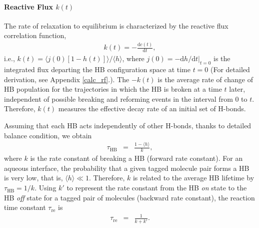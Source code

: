 \paragraph{Reactive Flux $k(t)$} 
The rate of relaxation to equilibrium is characterized by the reactive flux correlation function, 
\begin{eqnarray}
k(t) = -\frac{\text{d}c(t)}{\text{d}t},
\label{eq:k}
\end{eqnarray}
i.e., $k(t)=\langle j(0)[1-h(t)]\rangle/\langle h\rangle$\cite{AL96,AL00},
where 
$j(0)=-\text{d}h/\text{d}t|_{t=0}$ 
is the integrated flux departing the HB configuration space at time $t=0$ (For detailed derivation, see Appendix \ref{calc_rf}.).
The $-k(t)$ is the average rate of change of HB population for the trajectories in which the HB is broken at a time $t$ later\cite{AL96}, 
independent of possible breaking and reforming events in the interval from 0 to $t$.
Therefore, $k(t)$ measures the effective decay rate of an initial set of H-bonds\cite{DC87,Starr2000}.


Assuming that each HB acts independently of other H-bonds\cite{AL96,AL00}, 
thanks to detailed balance condition, we obtain 
\begin{eqnarray}
  \tau_{\text{HB}} &=& \frac{1- \langle h\rangle}{k},
\label{eq:rate}
\end{eqnarray}
where $k$ is the rate constant of breaking a HB (forward rate constant)\cite{Chandler1986,Chandler1978}. 
For an aqueous interface, the probability that a given tagged molecule pair forms a HB is very low, that is, $\langle h\rangle \ll 1$. 
Therefore, $k$ is related to the average HB lifetime by $\tau_{\text{HB}}=1/k$.
Using $k'$ to represent the rate constant from the HB \emph{on} state to the HB \emph{off} state for a tagged pair of molecules (backward rate constant),
the reaction time constant $\tau_\text{re}$ is 
\begin{eqnarray}
  \tau_\text{re} &=& \frac{1}{k+k'}.
\label{eq:reaction_rate_tau}
\end{eqnarray}

%
\FloatBarrier
